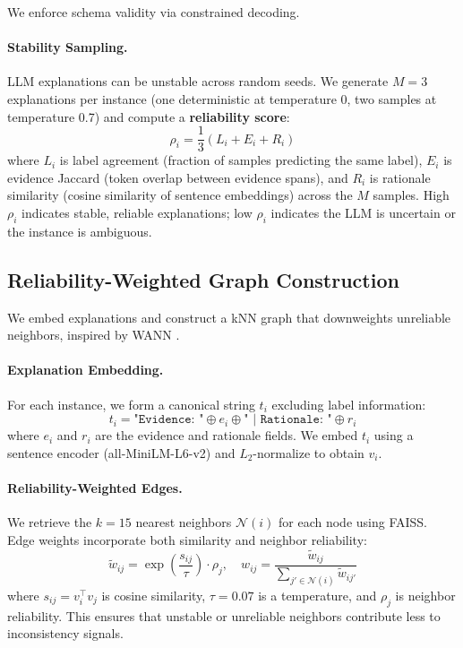 \documentclass[letterpaper]{article}
\begin{document}
We enforce schema validity via constrained decoding.

\paragraph{Stability Sampling.}
LLM explanations can be unstable across random seeds.
We generate $M=3$ explanations per instance (one deterministic at temperature 0, two samples at temperature 0.7) and compute a \textbf{reliability score}:
\begin{equation}
    \rho_i = \frac{1}{3}\left(L_i + E_i + R_i\right)
\end{equation}
where $L_i$ is label agreement (fraction of samples predicting the same label), $E_i$ is evidence Jaccard (token overlap between evidence spans), and $R_i$ is rationale similarity (cosine similarity of sentence embeddings) across the $M$ samples.
High $\rho_i$ indicates stable, reliable explanations; low $\rho_i$ indicates the LLM is uncertain or the instance is ambiguous.

\subsection{Reliability-Weighted Graph Construction}
\label{sec:graph}

We embed explanations and construct a kNN graph that downweights unreliable neighbors, inspired by WANN \citep{disalvo2025wann}.

\paragraph{Explanation Embedding.}
For each instance, we form a canonical string $t_i$ excluding label information:
\begin{equation}
    t_i = \texttt{"Evidence: "} \oplus e_i \oplus \texttt{" | Rationale: "} \oplus r_i
\end{equation}
where $e_i$ and $r_i$ are the evidence and rationale fields.
We embed $t_i$ using a sentence encoder (all-MiniLM-L6-v2) and $L_2$-normalize to obtain $v_i$.

\paragraph{Reliability-Weighted Edges.}
We retrieve the $k=15$ nearest neighbors $\mathcal{N}(i)$ for each node using FAISS.
Edge weights incorporate both similarity and neighbor reliability:
\begin{equation}
    \tilde{w}_{ij} = \exp\left(\frac{s_{ij}}{\tau}\right) \cdot \rho_j, \quad w_{ij} = \frac{\tilde{w}_{ij}}{\sum_{j' \in \mathcal{N}(i)} \tilde{w}_{ij'}}
\end{equation}
where $s_{ij} = v_i^\top v_j$ is cosine similarity, $\tau=0.07$ is a temperature, and $\rho_j$ is neighbor reliability.
This ensures that unstable or unreliable neighbors contribute less to inconsistency signals.
\end{document}
